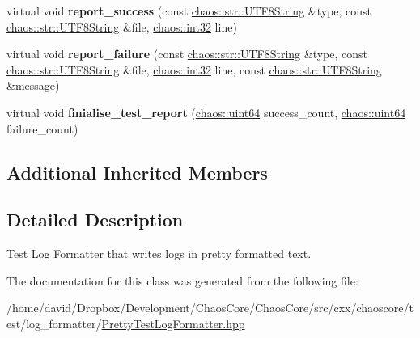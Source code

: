 \begin{DoxyCompactItemize}
\item 
\hypertarget{classchaos_1_1test_1_1log__formatter_1_1_pretty_test_log_formatter_afe82e87c8343d355387bf2937463c3f1}{virtual void {\bfseries report\-\_\-success} (const \hyperlink{classchaos_1_1str_1_1_u_t_f8_string}{chaos\-::str\-::\-U\-T\-F8\-String} \&type, const \hyperlink{classchaos_1_1str_1_1_u_t_f8_string}{chaos\-::str\-::\-U\-T\-F8\-String} \&file, \hyperlink{namespacechaos_ad1de7efb430365afd2c9446a0f522a90}{chaos\-::int32} line)}\label{classchaos_1_1test_1_1log__formatter_1_1_pretty_test_log_formatter_afe82e87c8343d355387bf2937463c3f1}

\item 
\hypertarget{classchaos_1_1test_1_1log__formatter_1_1_pretty_test_log_formatter_ab0bc855628912476da5a4c9eba970ee1}{virtual void {\bfseries report\-\_\-failure} (const \hyperlink{classchaos_1_1str_1_1_u_t_f8_string}{chaos\-::str\-::\-U\-T\-F8\-String} \&type, const \hyperlink{classchaos_1_1str_1_1_u_t_f8_string}{chaos\-::str\-::\-U\-T\-F8\-String} \&file, \hyperlink{namespacechaos_ad1de7efb430365afd2c9446a0f522a90}{chaos\-::int32} line, const \hyperlink{classchaos_1_1str_1_1_u_t_f8_string}{chaos\-::str\-::\-U\-T\-F8\-String} \&message)}\label{classchaos_1_1test_1_1log__formatter_1_1_pretty_test_log_formatter_ab0bc855628912476da5a4c9eba970ee1}

\item 
\hypertarget{classchaos_1_1test_1_1log__formatter_1_1_pretty_test_log_formatter_af52de712595c750da5d3c79501a62979}{virtual void {\bfseries finialise\-\_\-test\-\_\-report} (\hyperlink{namespacechaos_a34fe5f5bfc3ef6d80b5d094ed91b4d6e}{chaos\-::uint64} success\-\_\-count, \hyperlink{namespacechaos_a34fe5f5bfc3ef6d80b5d094ed91b4d6e}{chaos\-::uint64} failure\-\_\-count)}\label{classchaos_1_1test_1_1log__formatter_1_1_pretty_test_log_formatter_af52de712595c750da5d3c79501a62979}

\end{DoxyCompactItemize}
\subsection*{Additional Inherited Members}


\subsection{Detailed Description}
Test Log Formatter that writes logs in pretty formatted text. 

The documentation for this class was generated from the following file\-:\begin{DoxyCompactItemize}
\item 
/home/david/\-Dropbox/\-Development/\-Chaos\-Core/\-Chaos\-Core/src/cxx/chaoscore/test/log\-\_\-formatter/\hyperlink{_pretty_test_log_formatter_8hpp}{Pretty\-Test\-Log\-Formatter.\-hpp}\end{DoxyCompactItemize}
